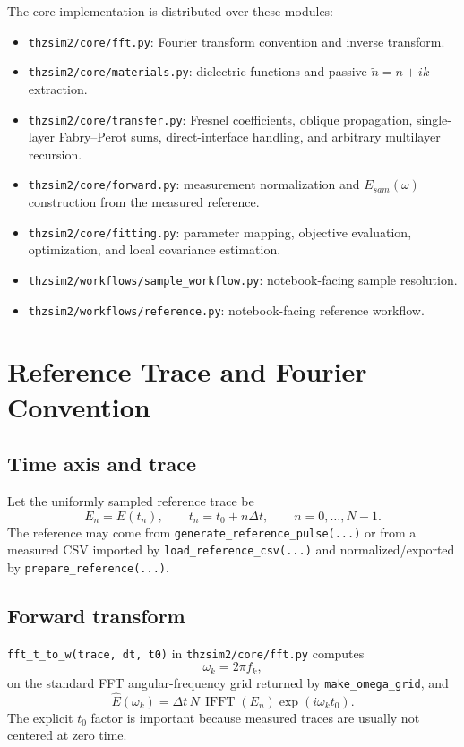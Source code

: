 \documentclass[11pt]{article}
\begin{document}
The core implementation is distributed over these modules:
\begin{itemize}[leftmargin=2em]
\item \texttt{thzsim2/core/fft.py}: Fourier transform convention and inverse transform.
\item \texttt{thzsim2/core/materials.py}: dielectric functions and passive
$\tilde{n}=n+i k$ extraction.
\item \texttt{thzsim2/core/transfer.py}: Fresnel coefficients, oblique propagation,
single-layer Fabry--Perot sums, direct-interface handling, and arbitrary multilayer recursion.
\item \texttt{thzsim2/core/forward.py}: measurement normalization and
$E_{sam}(\omega)$ construction from the measured reference.
\item \texttt{thzsim2/core/fitting.py}: parameter mapping, objective evaluation,
optimization, and local covariance estimation.
\item \texttt{thzsim2/workflows/sample\_workflow.py}: notebook-facing sample resolution.
\item \texttt{thzsim2/workflows/reference.py}: notebook-facing reference workflow.
\end{itemize}

\section{Reference Trace and Fourier Convention}
\subsection{Time axis and trace}
Let the uniformly sampled reference trace be
\[
E_n = E(t_n),
\qquad
t_n = t_0 + n \Delta t,
\qquad
n=0,\dots,N-1.
\]
The reference may come from \texttt{generate\_reference\_pulse(...)} or from a measured CSV
imported by \texttt{load\_reference\_csv(...)} and normalized/exported by
\texttt{prepare\_reference(...)}.

\subsection{Forward transform}
\texttt{fft\_t\_to\_w(trace, dt, t0)} in \texttt{thzsim2/core/fft.py} computes
\[
\omega_k = 2\pi f_k,
\]
on the standard FFT angular-frequency grid returned by \texttt{make\_omega\_grid}, and
\[
\hat{E}(\omega_k)
=
\Delta t \, N \,
\operatorname{IFFT}(E_n)
\exp(i \omega_k t_0).
\]
The explicit $t_0$ factor is important because measured traces are usually not centered at
zero time.
\end{document}
